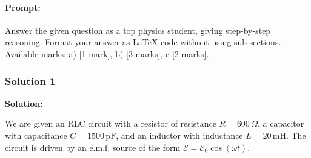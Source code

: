 \documentclass{article}
\begin{document}
\paragraph{Prompt: \\} 
Answer the given question as a top physics student, giving step-by-step reasoning. Format your answer as LaTeX code without using sub-sections. Available marks: a) [1 mark], b) [3 marks], c [2 marks].

\subsubsection{Solution 1}
\textbf{Solution:}

We are given an RLC circuit with a resistor of resistance $R = 600 \, \Omega$, a capacitor with capacitance $C = 1500 \, \mathrm{pF}$, and an inductor with inductance $L = 20 \, \mathrm{mH}$. The circuit is driven by an e.m.f. source of the form $\mathcal{E} = \mathcal{E}_0 \cos(\omega t)$.
\end{document}
